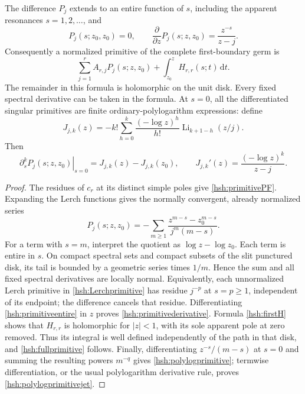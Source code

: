 \begin{proposition}
\label{hsh:primitive}
The difference $P_j$ extends to an entire function of $s$, including
the apparent resonances $s=1,2,\ldots$, and
\begin{equation}\label{hsh:primitivederivative}
 P_j(s;z_0,z_0)=0,\qquad
 \frac{\partial}{\partial z}P_j(s;z,z_0)=\frac{z^{-s}}{z-j}.
\end{equation}
Consequently a normalized primitive of the complete first-boundary germ is
\begin{equation}\label{hsh:fullprimitive}
 \sum_{j=1}^{r}A_{r,j}P_j(s;z,z_0)
                   +\int_{z_0}^{z}H_{r,r}(s;t)\,\mathrm dt.
\end{equation}
The remainder in this formula is holomorphic on the unit disk.
Every fixed spectral derivative can be taken in the formula.
At $s=0$, all the differentiated singular primitives are finite
ordinary-polylogarithm expressions: define
\begin{equation}\label{hsh:polylogprimitive}
 J_{j,k}(z)=-k!\sum_{h=0}^{k}\frac{(-\log z)^h}{h!}
                          \operatorname{Li}_{k+1-h}(z/j).
\end{equation}
Then
\begin{equation}\label{hsh:polylogprimitivejet}
 \left.\partial_s^kP_j(s;z,z_0)\right|_{s=0}
                         =J_{j,k}(z)-J_{j,k}(z_0),
 \qquad J_{j,k}'(z)=\frac{(-\log z)^k}{z-j}.
\end{equation}
\end{proposition}

\begin{proof}
The residues of $c_r$ at its distinct simple poles give
\eqref{hsh:primitivePF}.  Expanding the Lerch functions gives the
normally convergent, already normalized series
\begin{equation}\label{hsh:primitiveentire}
 P_j(s;z,z_0)=
 -\sum_{m\geq1}\frac{z^{m-s}-z_0^{m-s}}{j^m(m-s)}.
\end{equation}
For a term with $s=m$, interpret the quotient as
$\log z-\log z_0$.  Each term is entire in $s$.  On compact
spectral sets and compact subsets of the slit punctured disk, its tail
is bounded by a geometric series times $1/m$.  Hence the sum and all
fixed spectral derivatives are locally normal.  Equivalently, each
unnormalized Lerch primitive in \eqref{hsh:Lerchprimitive} has residue
$j^{-p}$ at $s=p\geq1$, independent of its endpoint; the difference
cancels that residue.  Differentiating \eqref{hsh:primitiveentire}
in $z$ proves \eqref{hsh:primitivederivative}.  Formula
\eqref{hsh:firstH} shows that $H_{r,r}$ is holomorphic for $|z|<1$,
with its sole apparent pole at zero removed.  Thus its integral is
well defined independently of the path in that disk, and
\eqref{hsh:fullprimitive} follows.  Finally, differentiating
$z^{-s}/(m-s)$ at $s=0$ and summing the resulting powers $m^{-q}$
gives \eqref{hsh:polylogprimitive}; termwise differentiation, or the
usual polylogarithm derivative rule, proves
\eqref{hsh:polylogprimitivejet}.
\end{proof}

